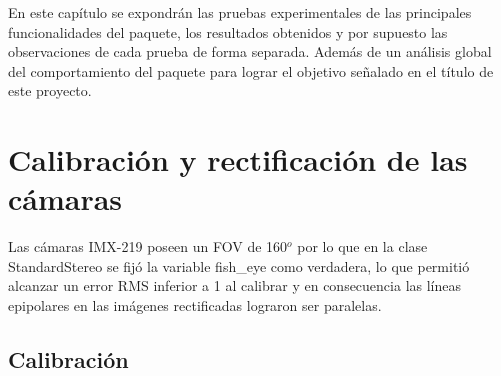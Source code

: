 En este capítulo se expondrán las pruebas experimentales de las principales funcionalidades del paquete, los resultados obtenidos y por supuesto las observaciones de cada prueba de forma separada. Además de un análisis global del comportamiento del paquete para lograr el objetivo señalado en el título de este proyecto.
\section{Calibración y rectificación de las cámaras}
Las cámaras IMX-219 poseen un FOV de 160$^o$ por lo que en la clase StandardStereo se fijó la variable fish\_eye como verdadera, lo que permitió alcanzar un error RMS inferior a 1 al calibrar y en consecuencia las líneas epipolares en las imágenes rectificadas lograron ser paralelas.
\subsection{Calibración}
